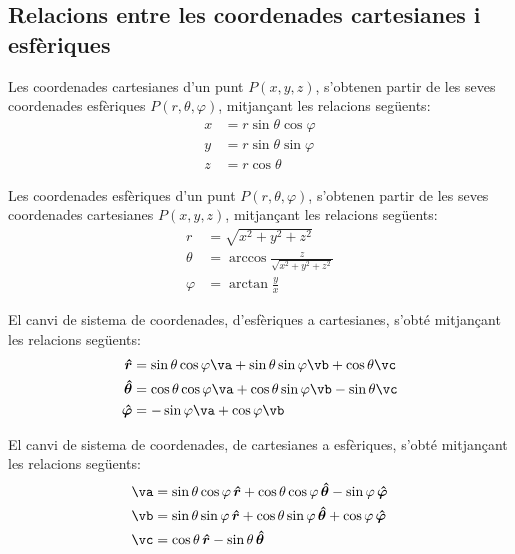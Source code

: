 \documentclass[catalan,a4paper,twoside,11pt]{article}
\begin{document}
\subsection{Relacions entre les coordenades cartesianes i
esf\`{e}riques}

Les coordenades cartesianes  d'un punt $P(x,y,z)$, s'obtenen partir
de les seves coordenades esf\`{e}riques $P(r,\theta,\varphi)$,
mitjan\c{c}ant les relacions seg\"{u}ents:
\begin{subequations}\begin{align}
    x &=r\sin\theta\cos\varphi \\ y &=r\sin\theta\sin\varphi \\ z &=r\cos\theta
\end{align}\end{subequations}

Les coordenades  esf\`{e}riques  d'un punt $P(r,\theta,\varphi)$,
s'obtenen partir de les seves coordenades cartesianes $P(x,y,z)$,
mitjan\c{c}ant les relacions seg\"{u}ents:
\begin{subequations}\begin{align}
    r &=\sqrt{x^2+y^2+z^2}\\
    \theta&=\arccos\frac{z}{\sqrt{x^2+y^2+z^2}}\\
    \varphi &=\arctan\frac{y}{x}
\end{align}\end{subequations}


El canvi de sistema de coordenades, d'esf\`{e}riques a cartesianes,
s'obt\'{e} mitjan\c{c}ant les relacions seg\"{u}ents:
\begin{subequations}\begin{align}
    \boldsymbol{\hat{r}} &=\sin\theta\cos\varphi\va+ \sin\theta\sin\varphi\vb+\cos\theta\vc\\
    \boldsymbol{\hat{\theta}} &=\cos\theta\cos\varphi\va+
    \cos\theta\sin\varphi\vb-\sin\theta\vc\\
    \boldsymbol{\hat{\varphi}}&=-\sin\varphi\va+\cos\varphi\vb
\end{align}\end{subequations}

El canvi de sistema de coordenades, de cartesianes a esf\`{e}riques,
s'obt\'{e} mitjan\c{c}ant les relacions seg\"{u}ents:
\begin{subequations}\begin{align}
    \va &=\sin\theta\cos\varphi\,\boldsymbol{\hat{r}}+
    \cos\theta\cos\varphi\,\boldsymbol{\hat{\theta}}-\sin\varphi\,\boldsymbol{\hat{\varphi}}\\
    \vb &=\sin\theta\sin\varphi\,\boldsymbol{\hat{r}}+
    \cos\theta\sin\varphi\,\boldsymbol{\hat{\theta}}+\cos\varphi\,\boldsymbol{\hat{\varphi}}\\
    \vc &=\cos\theta\,\boldsymbol{\hat{r}}-\sin\theta\,\boldsymbol{\hat{\theta}}
\end{align}\end{subequations}
\end{document}
